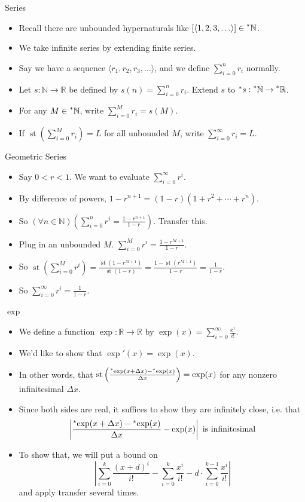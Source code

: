\documentclass{beamer}
\theoremstyle{plain}
\theoremstyle{definition}
\newcommand{\stp}[1]{\st\left(#1\right)}
\newcommand{\reals}{\mathbb{R}}
\newcommand{\hreals}{\prescript{*}{}{\mathbb{R}}}
\newcommand{\nats}{\mathbb{N}}
\newcommand{\hnats}{\prescript{*}{}{\mathbb{N}}}
\newcommand{\hr}[1]{\prescript{*}{}{#1}}
\DeclareMathOperator{\st}{st}
\begin{document}
\begin{frame}{Series}
\begin{itemize}
\item Recall there are unbounded hypernaturals like $[\langle 1, 2, 3, \ldots \rangle] \in \hnats$.
\item We take infinite series by extending finite series.
\item Say we have a sequence $\langle r_1, r_2, r_3, \ldots \rangle$, and we define $\sum_{i=0}^n r_i$ normally.
\item Let $s:\nats \to \reals$ be defined by $s(n) = \sum_{i=0}^n r_i$. Extend $s$ to $\hr{s}:\hnats \to \hreals$.
\item For any $M \in \hnats$, write $\sum_{i=0}^M r_i = s(M)$.
\item If $\stp{\sum_{i=0}^M r_i} = L$ for all unbounded $M$, write $\sum_{i=0}^\infty r_i = L$.
\end{itemize}
\end{frame}

\begin{frame}{Geometric Series}
\begin{itemize}
\setlength{\itemsep}{8pt}
\item Say $0 < r < 1$. We want to evaluate $\sum_{i=0}^\infty r^i$.
\item By difference of powers, $1 - r^{n+1} = (1 - r)(1 + r^2 + \cdots + r^n)$.
\item So $(\forall n \in \nats)(\sum_{i=0}^n r^i = \frac{1-r^{n+1}}{1-r})$. Transfer this.
\item Plug in an unbounded $M$. $\sum_{i=0}^M r^i = \frac{1-r^{M+1}}{1-r}$.
\item So $\stp{\sum_{i=0}^M r^i} = \frac{\stp{1 - r^{M+1}}}{\stp{1-r}} = \frac{1 - \stp{r^{M+1}}}{1 - r} = \frac{1}{1-r}$.
\item So $\sum_{i=0}^\infty r^i = \frac{1}{1-r}$.
\end{itemize}
\end{frame}

\begin{frame}{$\exp$}
\begin{itemize}
\item We define a function $\exp: \reals \to \reals$ by $\exp(x) = \sum_{i=0}^\infty \frac{x^i}{i!}$.
\item We'd like to show that $\exp'(x) = \exp(x)$.
\item In other words, that $\stp{\frac{\hr{\exp}(x + \Delta x) - \hr{\exp}(x)}{\Delta x}} = \exp(x)$ for any nonzero infinitesimal $\Delta x$.
\item Since both sides are real, it suffices to show they are infinitely close, i.e. that
\[ \left| \frac{\hr{\exp}(x + \Delta x) - \hr{\exp}(x)}{\Delta x} - \exp(x) \right| \text{ is infinitesimal}\]
\item To show that, we will put a bound on
\[ \left| \sum_{i=0}^k \frac{(x+d)^i}{i!} - \sum_{i=0}^k \frac{x^i}{i!} - d \cdot \sum_{i=0}^{k-1} \frac{x^i}{i!} \right| \]
and apply transfer several times.
\end{itemize}
\end{frame}
\end{document}
